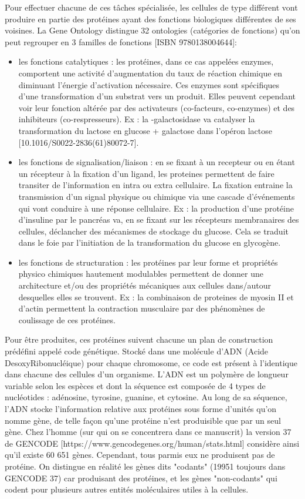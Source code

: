 Pour effectuer chacune de ces tâches spécialisée, les cellules de type différent vont produire en partie des protéines ayant des fonctions biologiques différentes de ses voisines. La Gene Ontology distingue 32 ontologies (catégories de fonctions) qu'on peut regrouper en 3 familles de fonctions [ISBN 9780138004644]: 
\begin{itemize}
    \item les fonctions catalytiques : les protéines, dans ce cas appelées enzymes, comportent une activité d'augmentation du taux de réaction chimique en diminuant l'énergie d'activation nécessaire. Ces enzymes sont spécifiques d'une transformation d'un substrat vers un produit. Elles peuvent cependant voir leur fonction altérée par des activateurs (co-facteurs, co-enzymes) et des inhibiteurs (co-respresseurs). Ex : la \beta-galactosidase va catalyser la transformation du lactose en glucose + galactose dans l'opéron lactose [10.1016/S0022-2836(61)80072-7].
    \item les fonctions de signalisation/liaison : en se fixant à un recepteur ou en étant un récepteur à la fixation d'un ligand, les proteines permettent de faire transiter de l'information en intra ou extra cellulaire. La fixation entraine la transmission d'un signal physique ou chimique via une cascade d'événements qui vont conduire à une réponse cellulaire. Ex : la production d'une protéine d'insuline par le pancréas va, en se fixant sur les récepteurs membranaires des cellules, déclancher des mécanismes de stockage du glucose. Cela se traduit dans le foie par l'initiation de la transformation du glucose en glycogène.
    \item les fonctions de structuration : les protéines par leur forme et propriétés physico chimiques hautement modulables permettent de donner une architecture et/ou des propriétés mécaniques aux cellules dans/autour desquelles elles se trouvent. Ex : la combinaison de proteines de myosin II et d'actin permettent la contraction musculaire par des phénomènes de coulissage de ces protéines.
\end{itemize}


Pour être produites, ces protéines suivent chacune un plan de construction prédéfini appelé code génétique. Stocké dans une molécule d'ADN (Acide DesoxyRibonucléique) pour chaque chromosome, ce code est présent à l'identique dans chacune des cellules d'un organisme. L'ADN est un polymère de longueur variable selon les espèces et dont la séquence est composée de 4 types de nucléotides : adénosine, tyrosine, guanine, et cytosine. Au long de sa séquence, l'ADN stocke l'information relative aux protéines sous forme d'unités qu'on nomme gène, de telle façon qu'une protéine n'est produisible que par un seul gène. Chez l'homme (sur qui on se concentrera dans ce manuscrit) la version 37 de GENCODE [https://www.gencodegenes.org/human/stats.html] considère ainsi qu'il existe 60 651 gènes. Cependant, tous parmis eux ne produisent pas de protéine. On distingue en réalité les gènes dits "codants" (19951 toujours dans GENCODE 37) car produisant des protéines, et les gènes "non-codants" qui codent pour plusieurs autres entités moléculaires utiles à la cellules.

